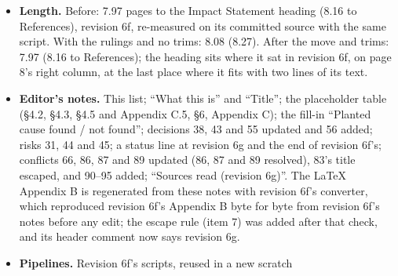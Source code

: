 \documentclass{article}
\theoremstyle{plain}
\theoremstyle{definition}
\theoremstyle{remark}
\begin{document}
\begin{itemize}
        read''; (6) \S{}4.3 ``The refusal pool comes from PKU-SafeRLHF'' $\to$
        ``\ldots{} is from PKU-SafeRLHF''; (7) \S{}4.3 ``Table 1 lists the
        stage-1 repairs; \S{}4.4 gives the references.'' $\to$ ``Table 1 lists
        the stage-1 repairs.'' (Table 1's caption says ``references in
        \S{}4.4''). Each was needed: without any one of the seven, or with
        \S{}4.2's first word order, the heading falls to the top of page 9.
        Tried and not kept: \S{}4.5 ``Because the truth is known, \ldots{} which
        natural menus at our budget cannot'' $\to$ ``With the truth known,
        \ldots{}'' (also in Appendix C.5); \S{}6 ``The planted cause is
        artificial'' $\to$ ``The plant is artificial''; \S{}6 ``We therefore
        report the best repair within each actor's menu (\S{}3.1); a data-only
        pipeline \ldots{}'' $\to$ ``\ldots{}; we report \ldots{}, and a
        data-only pipeline \ldots{}''; \S{}4.7 ``per arm and per scorer'' $\to$
        ``per arm and scorer''. With all eleven, item 4's \S{}6 sentence still
        put the heading at the top of page 9 (8.00), so it stays out.
  \item \textbf{Length.} Before: 7.97 pages to the Impact Statement heading
        (8.16 to References), revision 6f, re-measured on its committed source
        with the same script. With the rulings and no trims: 8.08 (8.27). After
        the move and trims: 7.97 (8.16 to References); the heading sits where it
        sat in revision 6f, on page 8's right column, at the last place where it
        fits with two lines of its text.
  \item \textbf{Editor's notes.} This list; ``What this is'' and ``Title''; the
        placeholder table (\S{}4.2, \S{}4.3, \S{}4.5 and Appendix C.5, \S{}6,
        Appendix C); the fill-in ``Planted cause found / not found''; decisions
        38, 43 and 55 updated and 56 added; risks 31, 44 and 45; a status line
        at revision 6g and the end of revision 6f's; conflicts 66, 86, 87 and 89
        updated (86, 87 and 89 resolved), 83's title escaped, and 90--95 added;
        ``Sources read (revision 6g)''. The LaTeX Appendix B is regenerated from
        these notes with revision 6f's converter, which reproduced revision 6f's
        Appendix B byte for byte from revision 6f's notes before any edit; the
        escape rule (item 7) was added after that check, and its header comment
        now says revision 6g.
  \item \textbf{Pipelines.} Revision 6f's scripts, reused in a new scratch

\end{itemize}
\end{document}

